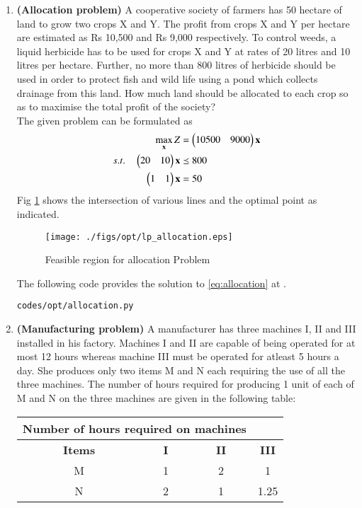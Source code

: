 \begin{enumerate}[label=\thesubsection.\arabic*.,ref=\thesubsection.\theenumi]
\item \textbf{(Allocation problem)} A cooperative society of farmers has 50 hectare
of land to grow two crops X and Y. The profit from crops X and Y per hectare are
estimated as Rs 10,500 and Rs 9,000 respectively. To control weeds, a liquid herbicide
has to be used for crops X and Y at rates of 20 litres and 10 litres per hectare. Further,
no more than 800 litres of herbicide should be used in order to protect fish and wild life
using a pond which collects drainage from this land. How much land should be allocated
to each crop so as to maximise the total profit of the society?\\
\solution The given problem can be formulated as
\begin{align}
\max_{\mathbf{x}} Z &= \begin{pmatrix}10500 & 9000\end{pmatrix}\mathbf{x}
\\
s.t. \quad 
\begin{pmatrix}
20 & 10
\end{pmatrix}
\mathbf{x} & \preceq 800
\\
\begin{pmatrix}
1 & 1
\end{pmatrix} 
\mathbf{x} &= 50
\label{eq:allocation}
\end{align}
Fig  \ref{fig:allocation}
shows the intersection of various lines and the optimal point as indicated.
\begin{figure}[h]
\texttt{[image: ./figs/opt/lp\_allocation.eps]}
\caption{Feasible region for allocation Problem}
\caption{}
\label{fig:allocation}
\end{figure}

The following code provides the solution to \eqref{eq:allocation} at .
%
\begin{lstlisting}
codes/opt/allocation.py
\end{lstlisting}

\item \textbf{(Manufacturing problem)} A manufacturer has three machines I, II
and III installed in his factory. Machines I and II are capable of being operated for
at most 12 hours whereas machine III must be operated for atleast 5 hours a day. She
produces only two items M and N each requiring the use of all the three machines.
The number of hours required for producing 1 unit of each of M and N on the three
machines are given in the following table:\\

\begin{tabular}{|c|c|c|c|}
\hline
 \multicolumn{3}{|l}{\textbf{ Number of hours required on machines}}& \\ \cline{2-4}
\hline
\textbf {Items}&\textbf{I}&\textbf{II}&\textbf{III}\\
\hline
M&1&2&1\\
\hline
 N&2&1&1.25\\
 \hline 


\end{tabular}
\end{enumerate}
